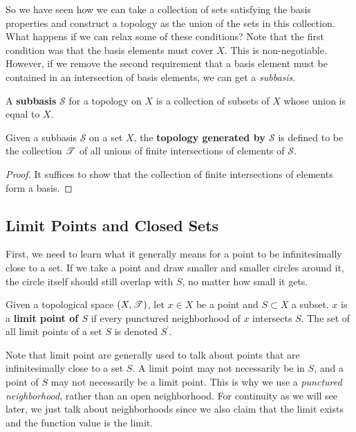   So we have seen how we can take a collection of sets satisfying the basis properties and construct a topology as the union of the sets in this collection. What happens if we can relax some of these conditions? Note that the first condition was that the basis elements must cover $X$. This is non-negotiable. However, if we remove the second requirement that a basis element must be contained in an intersection of basis elements, we can get a \textit{subbasis}. 

  \begin{definition}[Subbasis]
    A \textbf{subbasis} $\mathscr{S}$ for a topology on $X$ is a collection of subsets of $X$ whose union is equal to $X$. 
  \end{definition}

  \begin{theorem}
    Given a subbasis $\mathscr{S}$ on a set $X$, the \textbf{topology generated by $\mathscr{S}$} is defined to be the collection $\operatorname{\mathscr{T}}$ of all unions of finite intersections of elements of $\mathscr{S}$. 
  \end{theorem}
  \begin{proof}
    It suffices to show that the collection of finite intersections of elements form a basis. 
  \end{proof}
 
\subsection{Limit Points and Closed Sets} 

  First, we need to learn what it generally means for a point to be infinitesimally close to a set. If we take a point and draw smaller and smaller circles around it, the circle itself should still overlap with $S$, no matter how small it gets.

  \begin{definition}
    Given a topological space $(X, \operatorname{\mathscr{T}})$, let $x \in X$ be a point and $S \subset X$ a subset. $x$ is a \textbf{limit point of $S$} if every punctured neighborhood of $x$ intersects $S$. The set of all limit points of a set $S$ is denoted $S^\prime$.  
  \end{definition} 

  Note that limit point are generally used to talk about points that are infinitesimally close to a set $S$. A limit point may not necessarily be in $S$, and a point of $S$ may not necessarily be a limit point. This is why we use a \textit{punctured neighborhood}, rather than an open neighborhood. For continuity as we will see later, we just talk about neighborhoods since we also claim that the limit exists and the function value is the limit.

